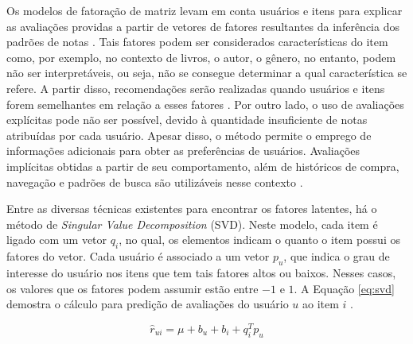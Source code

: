        Os modelos de fatoração de matriz levam em conta usuários e itens para explicar as avaliações providas a partir de vetores de fatores resultantes da inferência dos padrões de notas \cite{Koren2009}. Tais fatores podem ser considerados características do item como, por exemplo, no contexto de livros, o autor, o gênero, no entanto, podem não ser interpretáveis, ou seja, não se consegue determinar a qual característica se refere. A partir disso, recomendações serão realizadas quando usuários e itens forem semelhantes em relação a esses fatores \cite{Jannach2010}. Por outro lado, o uso de avaliações explícitas pode não ser possível, devido à quantidade insuficiente de notas atribuídas por cada usuário. Apesar disso, o método permite o emprego de informações adicionais para obter as preferências de usuários. Avaliações implícitas obtidas a partir de seu comportamento, além de históricos de compra, navegação e padrões de busca são utilizáveis nesse contexto \cite{Koren2009}. 
        
        
        
                
        Entre as diversas técnicas existentes para encontrar os fatores latentes, há o método de \textit{Singular Value Decomposition} (SVD). Neste modelo, cada item é ligado com um vetor $q_i$, no qual, os elementos indicam o quanto o item possui os fatores do vetor. Cada usuário é associado a um vetor $p_u$, que indica o grau de interesse do usuário nos itens que tem tais fatores altos ou baixos. Nesses casos, os valores que os fatores podem assumir estão entre $-1$ e $1$. A Equação \ref{eq:svd} demostra o cálculo para predição de avaliações do usuário $u$ ao item $i$ \cite{Ricci2010}.
        
        
        \begin{equation}
            \hat{r}_{ui} = \mu +b_u +b_i + q^T_ip_u  \label{eq:svd}
        \end{equation}
        
